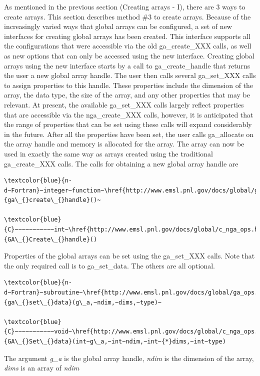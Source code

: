 As mentioned in the previous section (\textquotedbl{}Creating arrays
- I\textquotedbl{}), there are 3 ways to create arrays. This section
describes method \#3 to create arrays. Because of the increasingly
varied ways that global arrays can be configured, a set of new interfaces
for creating global arrays has been created. This interface supports
all the configurations that were accessible via the old ga\_create\_XXX
calls, as well as new options that can only be accessed using the
new interface. Creating global arrays using the new interface starts
by a call to ga\_create\_handle that returns the user a new global
array handle. The user then calls several ga\_set\_XXX calls to assign
properties to this handle. These properties include the dimension
of the array, the data type, the size of the array, and any other
properties that may be relevant. At present, the available ga\_set\_XXX
calls largely reflect properties that are accessible via the nga\_create\_XXX
calls, however, it is anticipated that the range of properties that
can be set using these calls will expand considerably in the future.
After all the properties have been set, the user calls ga\_allocate
on the array handle and memory is allocated for the array. The array
can now be used in exactly the same way as arrays created using the
traditional ga\_create\_XXX calls. The calls for obtaining a new global
array handle are
\begin{verbatim}
\textcolor{blue}{n-d~Fortran}~integer~function~\href{http://www.emsl.pnl.gov/docs/global/ga_ops.html\#NGA_CREATE_HANDLE}{ga\_{}create\_{}handle}()~

\textcolor{blue}{C}~~~~~~~~~~~int~\href{http://www.emsl.pnl.gov/docs/global/c_nga_ops.html\#GA_CREATE_HANDLE}{GA\_{}Create\_{}handle}()
\end{verbatim}
Properties of the global arrays can be set using the ga\_set\_XXX
calls. Note that the only required call is to ga\_set\_data. The others
are all optional.
\begin{verbatim}
\textcolor{blue}{n-d~Fortran}~subroutine~\href{http://www.emsl.pnl.gov/docs/global/ga_ops.html\#NGA_SET_DATA}{ga\_{}set\_{}data}(g\_a,~ndim,~dims,~type)~

\textcolor{blue}{C}~~~~~~~~~~~void~\href{http://www.emsl.pnl.gov/docs/global/c_nga_ops.html\#GA_SET_DATA}{GA\_{}Set\_{}data}(int~g\_a,~int~ndim,~int~{*}dims,~int~type)
\end{verbatim}
The argument \emph{g\_a} is the global array handle, \emph{ndim} is
the dimension of the array, \emph{dims} is an array of \emph{ndim}
